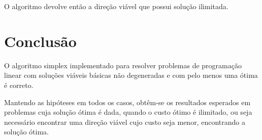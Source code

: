 \documentclass[
	12pt,				%
	openright,			%
	oneside,			%
	a4paper,			%
	english,			%
	french,				%
	spanish,			%
	brazil,				%
	]{abntex2}
\begin{document}
O algoritmo devolve então a direção viável que possui solução ilimitada.

 
%
%
%
%

%

\chapter*[Conclusão]{Conclusão}
O algoritmo simplex implementado para resolver problemas de programação linear com 
soluções viáveis básicas não degeneradas e com pelo menos uma ótima é correto.

Mantendo as hipóteses em todos os casos, obtêm-se os resultados esperados em problemas cuja 
solução ótima é dada, quando o custo ótimo é ilimitado, ou seja necessário encontrar uma 
direção viável cujo custo seja menor, encontrando a solução ótima.
%
%
%
%
%
%
%
\end{document}
